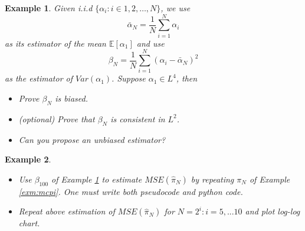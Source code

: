 \documentclass{article}
\newtheorem{example}{Example}
\begin{document}
\begin{example} \label{exm:mse}
 Given i.i.d $\{\alpha_i: i\in 1, 2, \ldots, N\}$, we use 
$$\bar \alpha_N = \frac 1 N \sum_{i=1}^N \alpha_i$$
as its estimator of the mean $\mathbb E[\alpha_1]$ 
and use
$$\beta_N = \frac 1 N \sum_{i=1}^N (\alpha_i -\bar \alpha_N)^2$$
as the estimator of $Var(\alpha_1)$. Suppose $\alpha_1\in L^4$, then 
\begin{itemize}
 \item Prove $\beta_N$ is biased.
 \item (optional) Prove that $\beta_N$ is consistent in $L^2$.
 \item Can you propose an unbiased estimator?
 \end{itemize}
\end{example}
\begin{example}
\begin{itemize}
 \item Use $\beta_{100}$ of Example \ref{exm:mse} to estimate 
 $MSE(\hat \pi_{N})$ by repeating $\pi_{N}$ of Example \ref{exm:mcpi}. One must write both pseudocode and python code.
 \item Repeat above estimation of $MSE(\hat \pi_{N})$ for $N= 2^{i}: i = 5, ...10$ and plot log-log chart.
\end{itemize}
 
\end{example}
\end{document}
